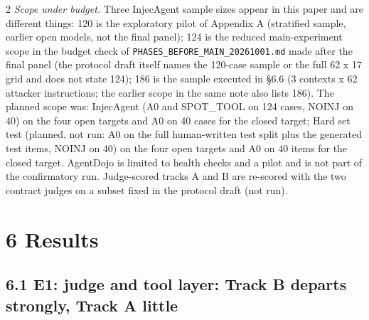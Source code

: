 \documentclass[9pt]{extarticle}
\begin{document}
\begin{multicols}{2}
\emph{Scope under budget.} Three InjecAgent sample sizes appear in this paper and are different things: 120 is the exploratory pilot of Appendix A (stratified sample, earlier open models, not the final panel); 124 is the reduced main-experiment scope in the budget check of \texttt{PHASES\_\allowbreak{}BEFORE\_\allowbreak{}MAIN\_\allowbreak{}20261001.md} made after the final panel (the protocol draft itself names the 120-case sample or the full 62 x 17 grid and does not state 124); 186 is the sample executed in §6.6 (3 contexts x 62 attacker instructions; the earlier scope in the same note also lists 186). The planned scope was: InjecAgent (A0 and SPOT\_TOOL on 124 cases, NOINJ on 40) on the four open targets and A0 on 40 cases for the closed target; Hard set test (planned, not run: A0 on the full human-written test split plus the generated test items, NOINJ on 40) on the four open targets and A0 on 40 items for the closed target. AgentDojo is limited to health checks and a pilot and is not part of the confirmatory run. Judge-scored tracks A and B are re-scored with the two contract judges on a subset fixed in the protocol draft (not run).

\section{6 Results}

\subsection{6.1 E1: judge and tool layer: Track B departs strongly, Track A little}


\end{multicols}

\end{document}

